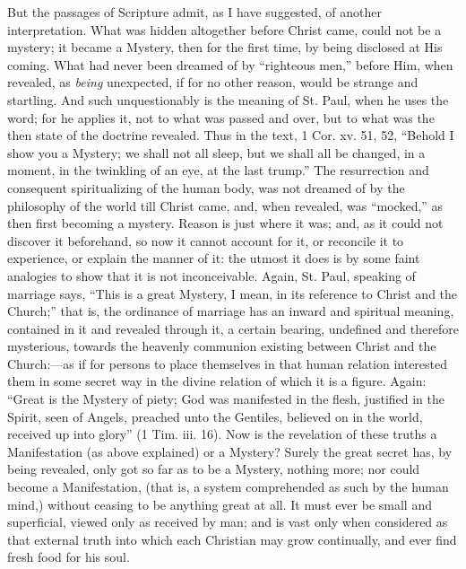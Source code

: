 But the passages of Scripture admit, as I have
suggested, of another interpretation. What was hidden altogether
before Christ came, could not be a mystery; it became a Mystery, then
for the first time, by being disclosed at His coming. What had never
been dreamed of by ``righteous men,'' before Him, when revealed, as
\emph{being} unexpected, if for no other reason, would be strange
and startling. And such unquestionably is the meaning of St. Paul,
when he uses the word; for he applies it, not to what was passed and
over, but to what was the then state of the doctrine revealed. Thus in
the text, 1 Cor. xv. 51, 52, ``Behold I show you a Mystery; we shall
not all sleep, but we shall all be changed, in a moment, in the
twinkling of an eye, at the last trump.'' The resurrection and
consequent spiritualizing of the human body, was not dreamed of by the
philosophy of the world till Christ came, and, when revealed, was ``mocked,'' as then first becoming a mystery. Reason is just where
it was; and, as it could not discover it beforehand, so now it cannot
account for it, or reconcile it to experience, or explain the manner
of it: the utmost it does is by some faint analogies to show that it
is not inconceivable. Again, St. Paul, speaking of marriage says, ``This is a great Mystery, I mean, in its reference to Christ and the
Church;'' that is, the ordinance of marriage has an inward and
spiritual meaning, contained in it and revealed through it, a certain
bearing, undefined and therefore mysterious, towards the heavenly
communion existing between Christ and the Church:—as if for persons
to place themselves in that human relation interested them in some
secret way in the divine relation of which it is a figure. Again: ``Great is the Mystery of piety; God was manifested in the flesh,
justified in the Spirit, seen of Angels, preached unto the Gentiles,
believed on in the world, received up into glory'' (1 Tim. iii. 16).
Now is the revelation of these truths a Manifestation (as above
explained) or a Mystery? Surely the great secret has, by being
revealed, only got so far as to be a Mystery, nothing more; nor could
become a Manifestation, (that is, a system comprehended as such by the
human mind,) without ceasing to be anything great at all. It must
ever be small and superficial, viewed only as received by man; and is
vast only when considered as that external truth into which each
Christian may grow continually, and ever find fresh food for his soul.

